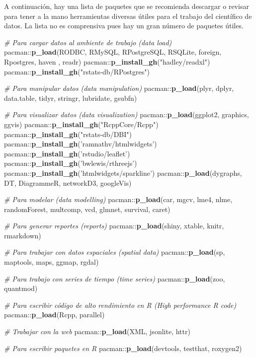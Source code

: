\documentclass[]{article}
\newenvironment{Shaded}{\begin{snugshade}}{\end{snugshade}}
\newcommand{\KeywordTok}[1]{\textcolor[rgb]{0.13,0.29,0.53}{\textbf{{#1}}}}
\newcommand{\StringTok}[1]{\textcolor[rgb]{0.31,0.60,0.02}{{#1}}}
\newcommand{\CommentTok}[1]{\textcolor[rgb]{0.56,0.35,0.01}{\textit{{#1}}}}
\newcommand{\NormalTok}[1]{{#1}}
\begin{document}
A continuación, hay una lista de paquetes que se recomienda descargar o
revisar para tener a la mano herramientas diversas útiles para el
trabajo del científico de datos. La lista no es comprensiva pues hay un
gran número de paquetes útiles.

\begin{Shaded}
\begin{Highlighting}[]
\CommentTok{# Para cargar datos al ambiente de trabajo (data load)}
\NormalTok{pacman::}\KeywordTok{p_load}\NormalTok{(RODBC, RMySQL, RPostgreSQL, RSQLite, foreign, Rpostgres, haven}
               \NormalTok{, readr)}
\NormalTok{pacman::}\KeywordTok{p_install_gh}\NormalTok{(}\StringTok{"hadley/readxl"}\NormalTok{)}
\NormalTok{pacman::}\KeywordTok{p_install_gh}\NormalTok{(}\StringTok{"rstats-db/RPostgres"}\NormalTok{)}

\CommentTok{# Para manipular datos (data manipulation)}
\NormalTok{pacman::}\KeywordTok{p_load}\NormalTok{(plyr, dplyr, data.table, tidyr, stringr, lubridate, gsubfn)}

\CommentTok{# Para visualizar datos (data visualization)}
\NormalTok{pacman::}\KeywordTok{p_load}\NormalTok{(ggplot2, graphics, ggvis)}
\NormalTok{pacman::}\KeywordTok{p_install_gh}\NormalTok{(}\StringTok{"RcppCore/Rcpp"}\NormalTok{)}
\NormalTok{pacman::}\KeywordTok{p_install_gh}\NormalTok{(}\StringTok{"rstats-db/DBI"}\NormalTok{)}
\NormalTok{pacman::}\KeywordTok{p_install_gh}\NormalTok{(}\StringTok{'ramnathv/htmlwidgets'}\NormalTok{)}
\NormalTok{pacman::}\KeywordTok{p_install_gh}\NormalTok{(}\StringTok{'rstudio/leaflet'}\NormalTok{)}
\NormalTok{pacman::}\KeywordTok{p_install_gh}\NormalTok{(}\StringTok{'bwlewis/rthreejs'}\NormalTok{)}
\NormalTok{pacman::}\KeywordTok{p_install_gh}\NormalTok{(}\StringTok{'htmlwidgets/sparkline'}\NormalTok{)}
\NormalTok{pacman::}\KeywordTok{p_load}\NormalTok{(dygraphs, DT, DiagrammeR, networkD3, googleVis)}

\CommentTok{# Para modelar (data modelling)}
\NormalTok{pacman::}\KeywordTok{p_load}\NormalTok{(car, mgcv, lme4, nlme, randomForest, multcomp, vcd, glmnet, survival, caret)}

\CommentTok{# Para generar reportes (reports)}
\NormalTok{pacman::}\KeywordTok{p_load}\NormalTok{(shiny, xtable, knitr, rmarkdown)}

\CommentTok{# Para trabajar con datos espaciales (spatial data)}
\NormalTok{pacman::}\KeywordTok{p_load}\NormalTok{(sp, maptools, maps, ggmap, rgdal)}

\CommentTok{# Para trabajo con series de tiempo (time series)}
\NormalTok{pacman::}\KeywordTok{p_load}\NormalTok{(zoo, quantmod)}

\CommentTok{# Para escribir código de alto rendimiento en R (High performance R code)}
\NormalTok{pacman::}\KeywordTok{p_load}\NormalTok{(Rcpp, parallel)}

\CommentTok{# Trabajar con la web }
\NormalTok{pacman::}\KeywordTok{p_load}\NormalTok{(XML, jsonlite, httr)}

\CommentTok{# Para escribir paquetes en R}
\NormalTok{pacman::}\KeywordTok{p_load}\NormalTok{(devtools, testthat, roxygen2)}
\end{Highlighting}
\end{Shaded}
\end{document}
